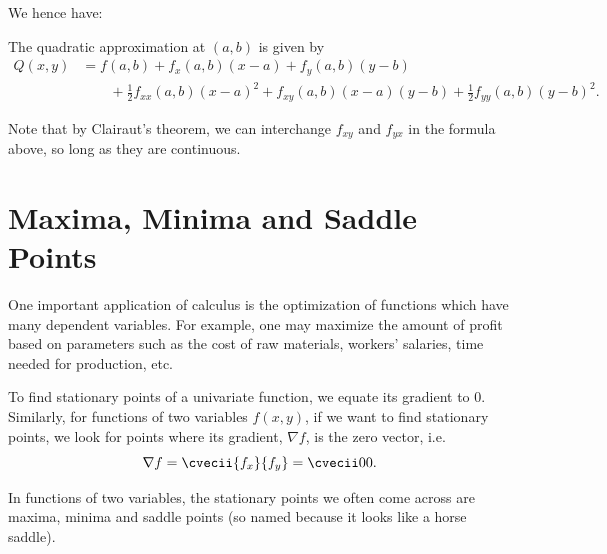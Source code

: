 We hence have:
\begin{proposition}
    The quadratic approximation at $(a, b)$ is given by
    \begin{align*}
        Q(x, y) &= f(a, b) + f_x(a, b) (x-a) + f_y(a, b) (y-b)\\
        &\hspace{2em} + \frac12 f_{xx}(a,b) (x-a)^2 + f_{xy}(a, b) (x-a)(y-b) + \frac12 f_{yy}(a, b) (y-b)^2.
    \end{align*}
\end{proposition}

Note that by Clairaut's theorem, we can interchange $f_{xy}$ and $f_{yx}$ in the formula above, so long as they are continuous.

\section{Maxima, Minima and Saddle Points}

One important application of calculus is the optimization of functions which have many dependent variables. For example, one may maximize the amount of profit based on parameters such as the cost of raw materials, workers' salaries, time needed for production, etc.

To find stationary points of a univariate function, we equate its gradient to 0. Similarly, for functions of two variables $f(x, y)$, if we want to find stationary points, we look for points where its gradient, $\nabla f$, is the zero vector, i.e. \[\nabla f = \cvecii{f_x}{f_y} = \cvecii00.\]

In functions of two variables, the stationary points we often come across are maxima, minima and saddle points (so named because it looks like a horse saddle).

